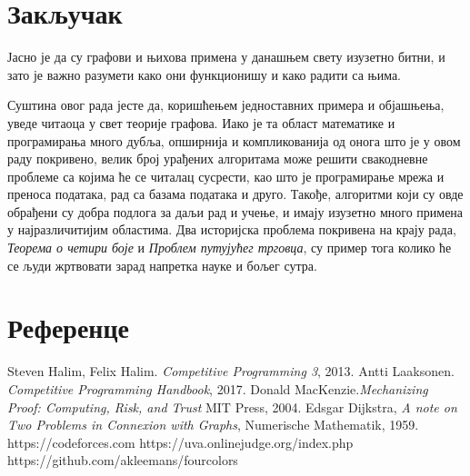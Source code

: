 \documentclass[11pt, oneside, a4paper]{article}
\begin{document}
\section{Закључак} 
Јасно је да су графови и њихова примена у данашњем свету изузетно битни, и зато је важно разумети како они функционишу и како радити са њима.\par
Суштина овог рада јесте да, коришћењем једноставних примера и објашњења, уведе читаоца у свет теорије графова. Иако је та област математике и програмирања много дубља, опширнија и компликованија од онога што је у овом раду покривено, велик број урађених алгоритама може решити свакодневне проблеме са којима ће се читалац сусрести, као што је програмирање мрежа и преноса података, рад са базама података и друго. Такође, алгоритми који су овде обрађени су добра подлога за даљи рад и учење, и имају изузетно много примена у најразличитијим областима. Два историјска проблема покривена на крају рада, \textit{Теорема о четири боје} и \textit{Проблем путујућег трговца}, су пример тога колико ће се људи жртвовати зарад напретка науке и бољег сутра.

\newpage
\section{Референце}
\renewcommand{\section}[2]{}
\begin{thebibliography}{6}
Steven Halim, Felix Halim. \textit{Competitive Programming 3}, 2013.
Antti Laaksonen. \textit{Competitive Programming Handbook}, 2017.
Donald MacKenzie.\textit{Mechanizing Proof: Computing, Risk, and Trust} MIT Press, 2004.
Edsgar Dijkstra, \textit{A note on Two Problems in Connexion with Graphs}, Numerische Mathematik, 1959.
https://codeforces.com
https://uva.onlinejudge.org/index.php
https://github.com/akleemans/fourcolors

\end{thebibliography}
\end{document}

